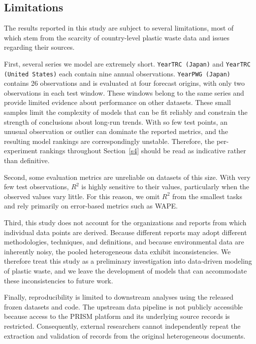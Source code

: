 \subsection{Limitations}

The results reported in this study are subject to several limitations, most of which stem from the scarcity of country-level plastic waste data and issues regarding their sources.

First, several series we model are extremely short.
\texttt{YearTRC (Japan)} and \texttt{YearTRC (United States)} each contain nine annual observations.
\texttt{YearPWG (Japan)} contains 26 observations and is evaluated at four forecast origins, with only two observations in each test window.
These windows belong to the same series and provide limited evidence about performance on other datasets.
These small samples limit the complexity of models that can be fit reliably and constrain the strength of conclusions about long-run trends.
With so few test points, an unusual observation or outlier can dominate the reported metrics, and the resulting model rankings are correspondingly unstable.
Therefore, the per-experiment rankings throughout Section~\ref{s4} should be read as indicative rather than definitive.

Second, some evaluation metrics are unreliable on datasets of this size.
With very few test observations, \(R^2\) is highly sensitive to their values, particularly when the observed values vary little.
For this reason, we omit \(R^2\) from the smallest tasks and rely primarily on error-based metrics such as WAPE.

Third, this study does not account for the organizations and reports from which individual data points are derived.
Because different reports may adopt different methodologies, techniques, and definitions, and because environmental data are inherently noisy, the pooled heterogeneous data exhibit inconsistencies.
We therefore treat this study as a preliminary investigation into data-driven modeling of plastic waste, and we leave the development of models that can accommodate these inconsistencies to future work.

Finally, reproducibility is limited to downstream analyses using the released frozen datasets and code.
The upstream data pipeline is not publicly accessible because access to the PRISM platform and its underlying source records is restricted.
Consequently, external researchers cannot independently repeat the extraction and validation of records from the original heterogeneous documents.
